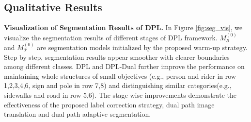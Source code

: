 \documentclass[10pt,twocolumn,letterpaper]{article}
\begin{document}
\subsection{Qualitative Results}
{\noindent \textbf{Visualization of Segmentation Results of DPL.}}\hspace{3pt}
In Figure \ref{fig:seg_vis}, we visualize the segmentation results of different stages of DPL framework. $M_\mathcal{S}^{(0)}$ and $M_\mathcal{T}^{(0)}$ are segmentation models initialized by the proposed warm-up strategy. Step by step, segmentation results appear smoother with clearer boundaries among different classes. DPL and DPL-Dual further improve the performance on maintaining whole structures of small objectives (e.g., person and rider in row 1,2,3,4,6, sign and pole in row 7,8) and distinguishing similar categories(e.g., sidewalks and road in row 5,6). The stage-wise improvements demonstrate the effectiveness of the proposed label correction strategy, dual path image translation and dual path adaptive segmentation.
\renewcommand{\arraystretch}{1}
\end{document}
